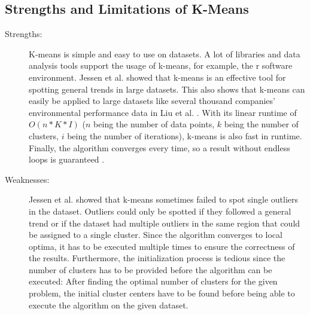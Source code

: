 \subsection{Strengths and Limitations of K-Means}
\begin{description}
    \item[Strengths:]
    K-means is simple and easy to use on datasets.
    A lot of libraries and data analysis tools support the usage of k-means, for example, the r software environment.
    Jessen et al. \cite{JES-IND} showed that k-means is an effective tool for spotting general trends in large datasets.
    This also shows that k-means can easily be applied to large datasets like several thousand companies' environmental performance data in Liu et al. \cite{LIU-BDE}.
    With its linear runtime of $O(n * K * I)$ ($n$ being the number of data points, $k$ being the number of clusters, $i$ being the number of iterations), k-means is also fast in runtime.
    Finally, the algorithm converges every time, so a result without endless loops is guaranteed \cite{SEL-GCT}.
    \item[Weaknesses:]
    Jessen et al. \cite{JES-IND} showed that k-means sometimes failed to spot single outliers in the dataset.
    Outliers could only be spotted if they followed a general trend or if the dataset had multiple outliers in the same region that could be assigned to a single cluster.
    Since the algorithm converges to local optima, it has to be executed multiple times to ensure the correctness of the results.
    Furthermore, the initialization process is tedious since the number of clusters has to be provided before the algorithm can be executed:
    After finding the optimal number of clusters for the given problem, the initial cluster centers have to be found before being able to execute the algorithm on the given dataset.

\end{description}
